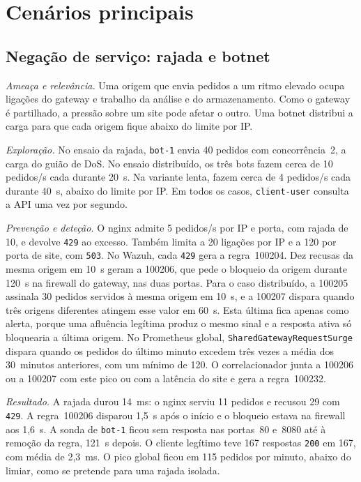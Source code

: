 \documentclass[conference,a4paper]{IEEEtran}
\newcommand{\code}[1]{\texttt{\small #1}}
\begin{document}
\section{Cenários principais}
\subsection{Negação de serviço: rajada e botnet}
\emph{Ameaça e relevância.} Uma origem que envia pedidos a um ritmo elevado ocupa ligações do gateway e trabalho da análise e do armazenamento. Como o gateway é partilhado, a pressão sobre um site pode afetar o outro. Uma botnet distribui a carga para que cada origem fique abaixo do limite por IP.

\emph{Exploração.} No ensaio da rajada, \code{bot-1} envia 40 pedidos com concorrência~2, a carga do guião de DoS. No ensaio distribuído, os três bots fazem cerca de 10 pedidos/s cada durante 20~s. Na variante lenta, fazem cerca de 4 pedidos/s cada durante 40~s, abaixo do limite por IP. Em todos os casos, \code{client-user} consulta a API uma vez por segundo.

\emph{Prevenção e deteção.} O nginx admite 5 pedidos/s por IP e porta, com rajada de 10, e devolve \code{429} ao excesso. Também limita a 20 ligações por IP e a 120 por porta de site, com \code{503}. No Wazuh, cada \code{429} gera a regra~100204. Dez recusas da mesma origem em 10~s geram a 100206, que pede o bloqueio da origem durante 120~s na firewall do gateway, nas duas portas. Para o caso distribuído, a 100205 assinala 30 pedidos servidos à mesma origem em 10~s, e a 100207 dispara quando três origens diferentes atingem esse valor em 60~s. Esta última fica apenas como alerta, porque uma afluência legítima produz o mesmo sinal e a resposta ativa só bloquearia a última origem. No Prometheus global, \code{SharedGatewayRequestSurge} dispara quando os pedidos do último minuto excedem três vezes a média dos 30~minutos anteriores, com um mínimo de 120. O correlacionador junta a 100206 ou a 100207 com este pico ou com a latência do site e gera a regra~100232.

\emph{Resultado.} A rajada durou 14~ms: o nginx serviu 11 pedidos e recusou 29 com \code{429}. A regra~100206 disparou 1,5~s após o início e o bloqueio estava na firewall aos 1,6~s. A sonda de \code{bot-1} ficou sem resposta nas portas~80 e~8080 até à remoção da regra, 121~s depois. O cliente legítimo teve 167 respostas \code{200} em 167, com média de 2,3~ms. O pico global ficou em 115 pedidos por minuto, abaixo do limiar, como se pretende para uma rajada isolada.
\end{document}
